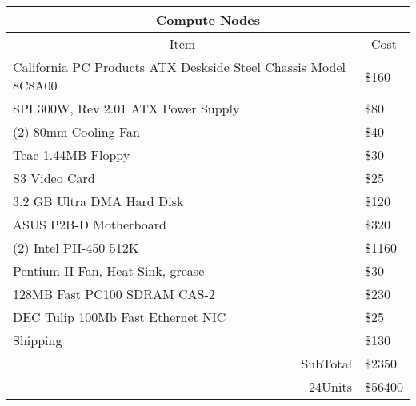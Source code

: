 \documentclass{article}
\begin{document}
\begin{tabular}
[c]{|c|c|}\hline\hline
\multicolumn{2}{|c|}{Compute Nodes}\\\hline\hline
Item & Cost\\\cline{1-1}%
\multicolumn{1}{|l|}{California PC Products ATX Deskside Steel Chassis Model
8C8A00} & \multicolumn{1}{|l|}{\$160}\\\cline{1-1}%
\multicolumn{1}{|l|}{SPI 300W, Rev 2.01 ATX Power Supply} &
\multicolumn{1}{|l|}{\$80}\\\cline{1-1}%
\multicolumn{1}{|l|}{(2) 80mm Cooling Fan} & \multicolumn{1}{|l|}{\$40}%
\\\cline{1-1}%
\multicolumn{1}{|l|}{Teac 1.44MB Floppy} & \multicolumn{1}{|l|}{\$30}%
\\\cline{1-1}%
\multicolumn{1}{|l|}{S3 Video Card} & \multicolumn{1}{|l|}{\$25}\\\cline{1-1}%
\multicolumn{1}{|l|}{3.2 GB Ultra DMA Hard Disk} & \multicolumn{1}{|l|}{\$120}%
\\\cline{1-1}%
\multicolumn{1}{|l|}{ASUS P2B-D Motherboard} & \multicolumn{1}{|l|}{\$320}%
\\\cline{1-1}%
\multicolumn{1}{|l|}{(2) Intel PII-450 512K} & \multicolumn{1}{|l|}{\$1160}%
\\\cline{1-1}%
\multicolumn{1}{|l|}{Pentium II Fan, Heat Sink, grease} &
\multicolumn{1}{|l|}{\$30}\\\hline
\multicolumn{1}{|l|}{128MB Fast PC100 SDRAM CAS-2} &
\multicolumn{1}{|l|}{\$230}\\\hline
\multicolumn{1}{|l|}{DEC Tulip 100Mb Fast Ethernet NIC} &
\multicolumn{1}{|l|}{\$25}\\\hline
\multicolumn{1}{|l|}{Shipping} & \multicolumn{1}{|l|}{\$130}\\\hline
\multicolumn{1}{|r|}{SubTotal} & \multicolumn{1}{|l|}{\$2350}\\\hline
\multicolumn{1}{|r|}{24Units} & \multicolumn{1}{|l|}{\$56400}\\\hline
\end{tabular}
\newline 

\bigskip%
\end{document}
